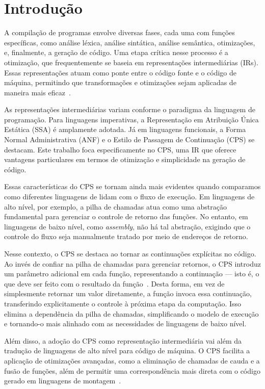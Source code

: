 \chapter{Introdução}\label{sec:introducao}

A compilação de programas envolve diversas fases, cada uma com funções específicas, como análise léxica, análise sintática, análise semântica, otimizações, e, finalmente, a geração de código.
Uma etapa crítica nesse processo é a otimização, que frequentemente se baseia em representações intermediárias (IRs).
Essas representações atuam como ponte entre o código fonte e o código de máquina, permitindo que transformações e otimizações sejam aplicadas de maneira mais eficaz~\cite{PLOTKIN1975125}.

As representações intermediárias variam conforme o paradigma da linguagem de programação.
Para linguagens imperativas, a Representação em Atribuição Única Estática (SSA) é amplamente adotada.
Já em linguagens funcionais, a Forma Normal Administrativa (ANF) e o Estilo de Passagem de Continuação (CPS) se destacam.
Este trabalho foca especificamente no CPS, uma IR que oferece vantagens particulares em termos de otimização e simplicidade na geração de código.

Essas características do CPS se tornam ainda mais evidentes quando comparamos como diferentes linguagens de lidam com o fluxo de execução. Em linguagens de alto nível, por exemplo, a pilha de chamadas atua como uma abstração fundamental para gerenciar o controle de retorno das funções. No entanto, em linguagens de baixo nível, como \textit{assembly}, não há tal abstração, exigindo que o controle do fluxo seja manualmente tratado por meio de endereços de retorno.

Nesse contexto, o CPS se destaca ao tornar as continuações explícitas no código.
Ao invés de confiar na pilha de chamadas para gerenciar retornos, o CPS introduz um parâmetro adicional em cada função, representando a continuação — isto é, o que deve ser feito com o resultado da função~\cite{KENNEDY2007}.
Desta forma, em vez de simplesmente retornar um valor diretamente, a função invoca essa continuação, transferindo explicitamente o controle à próxima etapa da computação.
Isso elimina a dependência da pilha de chamadas, simplificando o modelo de execução e tornando-o mais alinhado com as necessidades de linguagens de baixo nível.

Além disso, a adoção do CPS como representação intermediária vai além da tradução de linguagens de alto nível para código de máquina.
O CPS facilita a aplicação de otimizações avançadas, como a eliminação de chamadas de cauda e a fusão de funções, além de permitir uma correspondência mais direta com o código gerado em linguagens de montagem~\cite{FLANAGAN1993}.

